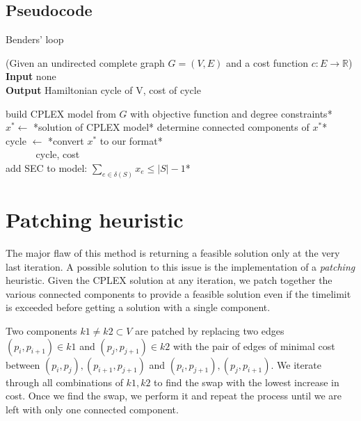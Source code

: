 \subsection{Pseudocode}
\begin{algorithm}[h]
    \caption{Benders' loop}
    (Given an undirected complete graph $G=(V,E)$ and a cost function $c:E\rightarrow\mathbb{R}$)\\

    \textbf{Input} none\\
    \textbf{Output} Hamiltonian cycle of V, cost of cycle\\
    \begin{algorithmic}

        \State *build CPLEX model from $G$ with objective function and degree constraints*\\
            \State $x^* \gets$ *solution of CPLEX model*
            \State *determine connected components of $x^*$*\\

                \State cycle $\gets$ *convert $x^*$ to our format*\\
                $\quad\;\;\quad\;\;$\Return cycle, cost
            \EndIf\\

                \State *add SEC to model: $\sum_{e\in\delta(S)}x_e\leq|S|-1$*
            \EndFor
        \EndWhile

    \end{algorithmic}
\end{algorithm}
\FloatBarrier

\section{Patching heuristic}
The major flaw of this method is returning a feasible solution only at the very last iteration. A possible solution to this issue is the implementation of a \textit{patching} heuristic. Given the CPLEX solution at any iteration, we patch together the various connected components to provide a feasible solution even if the timelimit is exceeded before getting a solution with a single component.

Two components $k1\neq k2\subset V$ are patched by replacing two edges $(p_i, p_{i+1})\in k1$ and $(p_j, p_{j+1})\in k2$ with the pair of edges of minimal cost between $(p_i,p_j), (p_{i+1},p_{j+1})$ and $(p_i,p_{j+1}),(p_j, p_{i+1})$. We iterate through all combinations of $k1,k2$ to find the swap with the lowest increase in cost. Once we find the swap, we perform it and repeat the process until we are left with only one connected component.

